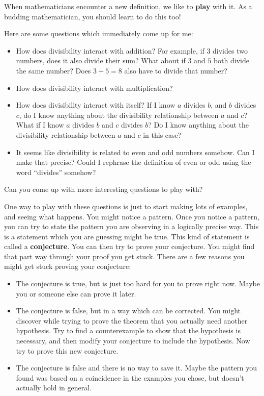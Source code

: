 When mathematicians encounter a new definition, we like to \textbf{play} with it.  As a budding mathematician, you should learn to do this too!

Here are some questions which immediately come up for me:

\begin{itemize}
	\item How does divisibility interact with addition?  For example, if $3$ divides two numbers, does it also divide their sum?  What about if $3$ and $5$ both divide the same number?  Does $3+5 = 8$ also have to divide that number?
	\item How does divisibility interact with multiplication?
	\item How does divisibility interact with itself?  If I know $a$ divides $b$, and $b$ divides $c$, do I know anything about the divisibility relationship between $a$ and $c$?  What if I know $a$ divides $b$ and $c$ divides $b$?  Do I know anything about the divisibility relationship between $a$ and $c$ in this case?
	\item It seems like divisibility is related to even and odd numbers somehow.  Can I make that precise?  Could I rephrase the definition of even or odd using the word ``divides'' somehow?
\end{itemize}

Can you come up with more interesting questions to play with?

One way to play with these questions is just to start making lots of examples, and seeing what happens.  You might notice a pattern.  Once you notice a pattern, you can try to state the pattern you are observing in a logically precise way.  This is a statement which you are guessing might be true.  This kind of statement is called a \textbf{conjecture}.  You can then try to prove your conjecture.  You might find that part way through your proof you get stuck.  There are a few reasons you might get stuck proving your conjecture:

\begin{itemize}
	\item The conjecture is true, but is just too hard for you to prove right now.  Maybe you or someone else can prove it later.
	\item The conjecture is false, but in a way which can be corrected.  You might discover while trying to prove the theorem that you actually need another hypothesis.  Try to find a counterexample to show that the hypothesis is necessary, and then modify your conjecture to include the hypothesis.  Now try to prove this new conjecture.
	\item The conjecture is false and there is no way to save it.  Maybe the pattern you found was based on a coincidence in the examples you chose, but doesn't actually hold in general.
\end{itemize}

